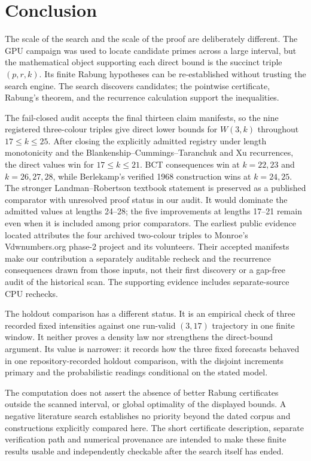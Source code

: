 \section{Conclusion}\label{s:conclusion}

The scale of the search and the scale of the proof are deliberately different.
The GPU campaign was used to locate candidate primes across a large interval,
but the mathematical object supporting each direct bound is the succinct triple
$(p,r,k)$.  Its finite Rabung hypotheses can be re-established without trusting
the search engine.  The search discovers candidates; the pointwise certificate,
Rabung's theorem, and the recurrence calculation support the inequalities.

The fail-closed audit accepts the final thirteen claim manifests, so the nine
registered three-colour triples give direct lower bounds for $W(3,k)$ throughout
$17\le k\le25$. After closing the explicitly admitted registry under length
monotonicity and the Blankenship--Cummings--Taranchuk and Xu recurrences, the
direct values win for $17\le k\le21$. BCT consequences win at $k=22,23$ and
$k=26,27,28$, while Berlekamp's verified 1968 construction wins at $k=24,25$.
The stronger Landman--Robertson textbook statement is preserved as a
published comparator with unresolved proof status in our audit. It would
dominate the admitted values at lengths 24--28; the five improvements at
lengths 17--21 remain even when it is included among prior comparators. The earliest
public evidence located attributes the four archived two-colour triples to
Monroe's Vdwnumbers.org phase-2 project and its volunteers. Their accepted
manifests make our contribution a separately auditable recheck and the
recurrence consequences drawn from those inputs, not their first discovery or
a gap-free audit of the historical scan. The supporting evidence includes
separate-source CPU rechecks.

The holdout comparison has a different status.  It is an empirical check of
three recorded fixed intensities against one run-valid $(3,17)$ trajectory in
one finite window.  It neither proves a density law nor strengthens the
direct-bound argument.  Its value is narrower: it records how the three fixed
forecasts behaved in one repository-recorded holdout comparison, with the
disjoint increments primary and the probabilistic readings conditional on the
stated model.

The computation does not assert the absence of better Rabung certificates
outside the scanned interval, or global optimality of the displayed bounds.
A negative literature search establishes no priority beyond the dated corpus
and constructions explicitly compared here. The short certificate description,
separate verification path and numerical provenance are intended to make these
finite results usable and independently checkable after the search itself has
ended.
